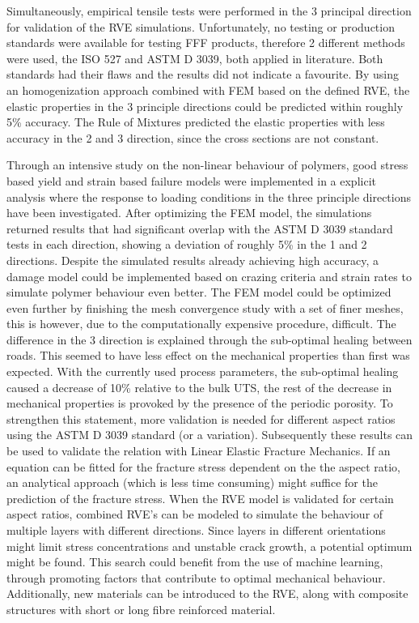 Simultaneously, empirical tensile tests were performed in the 3 principal direction for validation of the RVE simulations. Unfortunately, no testing or production standards were available for testing FFF products, therefore 2 different methods were used, the ISO 527 and ASTM D 3039, both applied in literature. Both standards had their flaws and the results did not indicate a favourite.  
By using an homogenization approach combined with FEM based on the defined RVE, the elastic properties in the 3 principle directions could be predicted within roughly 5\% accuracy. The Rule of Mixtures predicted the elastic properties with less accuracy in the 2 and 3 direction, since the cross sections are not constant. 

Through an intensive study on the non-linear behaviour of polymers, good stress based yield and strain based failure models were implemented in a explicit analysis where the response to loading conditions in the three principle directions have been investigated. After optimizing the FEM model, the simulations returned results that had significant overlap with the ASTM D 3039 standard tests in each direction, showing a deviation of roughly 5\% in the 1 and 2 directions. Despite the simulated results already achieving high accuracy, a damage model could be implemented based on crazing criteria and strain rates to simulate polymer behaviour even better. The FEM model could be optimized even further by finishing the mesh convergence study with a set of finer meshes, this is however, due to the computationally expensive procedure, difficult. The difference in the 3 direction is explained through the sub-optimal healing between roads. This seemed to have less effect on the mechanical properties than first was expected. With the currently used process parameters, the sub-optimal healing caused a decrease of 10\% relative to the bulk UTS, the rest of the decrease in mechanical properties is provoked by the presence of the periodic porosity. To strengthen this statement, more validation is needed for different aspect ratios using the ASTM D 3039 standard (or a variation).  Subsequently these results can be used to validate the relation with Linear Elastic Fracture Mechanics. If an equation can be fitted for the fracture stress dependent on the the aspect ratio, an analytical approach (which is less time consuming) might suffice for the prediction of the fracture stress. 
When the RVE model is validated for certain aspect ratios, combined RVE's can be modeled to simulate the behaviour of multiple layers with different directions. Since layers in different orientations might limit stress concentrations and unstable crack growth, a potential optimum might be found. This search could benefit from the use of machine learning, through promoting factors that contribute to optimal mechanical behaviour. Additionally, new materials can be introduced to the RVE, along with composite structures with short or long fibre reinforced material.  

